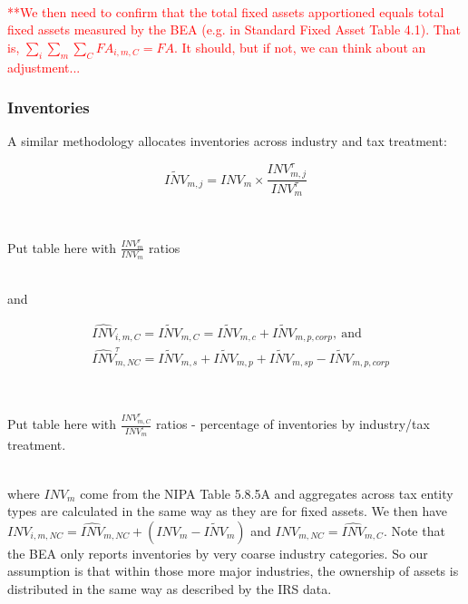 \documentclass[article,11pt,letterpaper,fleqn]{article}
\theoremstyle{definition}
\numberwithin{equation}{section}
\begin{document}
\ \\
\textcolor{red}{**We then need to confirm that the total fixed assets apportioned equals total fixed assets measured by the BEA (e.g. in Standard Fixed Asset Table 4.1).  That is, $\sum_{i}\sum_{m}\sum_{C}{FA}_{i,m,C}=FA$. It should, but if not, we can think about an adjustment...}
\ \\


\subsubsection{Inventories}

A similar methodology allocates inventories across industry and tax treatment:  

\begin{equation}
\widetilde{INV}_{m,j}={INV}_{m}\times \frac{{INV}^{\tau}_{m,j}}{{INV}^{\tau}_{m}}
\end{equation}

\ \\
\begin{center}
Put table here with $\frac{{INV}^{\tau}_{m}}{{INV}_{m}}$ ratios 
\end{center}
\ \\

\noindent\noindent and 


\begin{align}
& \widehat{INV}_{i,m,C}=\widetilde{INV}_{m,C}=\widetilde{INV}_{m,c}+\widetilde{INV}_{m,p,corp}, \ \text{and} \\
& \widehat{INV}^{\tau}_{m,NC}=\widetilde{INV}_{m,s}+\widetilde{INV}_{m,p}+\widetilde{INV}_{m,sp}-\widetilde{INV}_{m,p,corp}
\end{align} 

\ \\
\begin{center}
Put table here with $\frac{{INV}^{\tau}_{m,C}}{{INV}^{\tau}_{m}}$ ratios - percentage of inventories by industry/tax treatment.
\end{center}
\ \\

\noindent\noindent where ${INV}_{m}$ come from the NIPA Table 5.8.5A and aggregates across tax entity types are calculated in the same way as they are for fixed assets.  We then have ${INV}_{i,m,NC}=\widehat{INV}_{m,NC}+({INV}_{m}-\widetilde{INV}_{m})$ and ${INV}_{m,NC}=\widehat{INV}_{m,C}$.  Note that the BEA only reports inventories by very coarse industry categories.  So our assumption is that within those more major industries, the ownership of assets is distributed in the same way as described by the IRS data.
\end{document}
